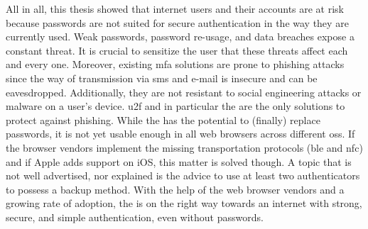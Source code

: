 All in all, this thesis showed that internet users and their accounts are at risk because passwords are not suited for secure authentication in the way they are currently used. Weak passwords, password re-usage, and data breaches expose a constant threat. It is crucial to sensitize the user that these threats affect each and every one. Moreover, existing \gls{mfa} solutions are prone to phishing attacks since the way of transmission via \gls{sms} and e-mail is insecure and can be eavesdropped. Additionally, they are not resistant to social engineering attacks or malware on a user's device. \gls{u2f} and in particular the \wa{} are the only solutions to protect against phishing. While the \wa{} has the potential to (finally) replace passwords, it is not yet usable enough in all web browsers across different \glspl{os}. If the browser vendors implement the missing transportation protocols (\gls{ble} and \gls{nfc}) and if Apple adds support on iOS, this matter is solved though. A topic that is not well advertised, nor explained is the advice to use at least two authenticators to possess a backup method. With the help of the web browser vendors and a growing rate of adoption, the \wa{} is on the right way towards an internet with strong, secure, and simple authentication, even without passwords.